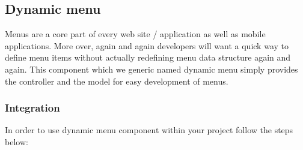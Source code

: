 \documentclass[letterpaper,10pt,english]{sphinxmanual}
\begin{document}
\subsection{Dynamic menu}
\label{features/components/dynamic_menu/dynamic_menu::doc}\label{features/components/dynamic_menu/dynamic_menu:dynamic-menu}
Menus are a core part of every web site / application as well as mobile applications. More over, again and again
developers will want a quick way to define menu items without actually redefining menu data structure again and again.
This component which we generic named dynamic menu simply provides the controller and the model for easy development of menus.


\subsubsection{Integration}
\label{features/components/dynamic_menu/dynamic_menu:integration}
In order to use dynamic menu component within your project follow the steps below:
\end{document}
